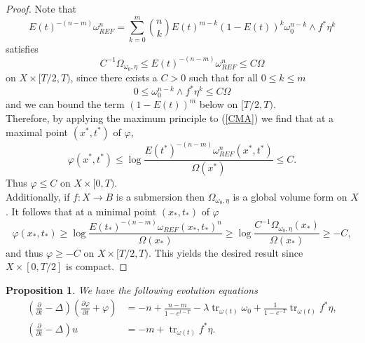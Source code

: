 \documentclass[12pt]{article}
\newtheorem{proposition}[theorem]{Proposition}
\numberwithin{equation}{section}
\renewcommand{\d}{\partial}
\DeclareMathOperator{\tr}{tr}
\newcommand{\parabolic}[1]{\left(\frac{\d}{\d t} - \Delta_{#1}\right)}
\begin{document}
\begin{proof}
Note that
\begin{equation*}
    E(t)^{-(n-m)}\omega_{REF}^n = \sum_{k=0}^m {n \choose k} E(t)^{m-k} (1-E(t))^{k} \omega_0^{n-k} \wedge f^* \eta^k
\end{equation*}
satisfies
\begin{equation*}
    C^{-1} \Omega_{\omega_0,\eta} \leq E(t)^{-(n-m)} \omega_{REF}^n \leq C\Omega
\end{equation*}
on $X \times [T/2, T)$, since there exists a $C > 0$ such that for all $0 \leq k \leq m$
\begin{equation*}
    0 \leq \omega_0^{n-k} \wedge f^* \eta ^k \leq C\Omega
\end{equation*}
and we can bound the term $(1-E(t))^m$ below on $[T/2,T)$.\\
Therefore, by applying the maximum principle to (\ref{CMA}) we find that at a maximal point $(x^*,t^*)$ of $\varphi$,
\begin{equation*}
    \varphi(x^*,t^*) \leq \log \frac{E(t^*)^{-(n-m)}\omega^n_{REF}(x^*,t^*)}{\Omega(x^*)} \leq C.
\end{equation*}
Thus $\varphi \leq C$ on $X \times [0,T)$.\\
Additionally, if $f: X \to B$ is a submersion then $\Omega_{\omega_0,\eta}$ is a global volume form on $X$. It follows that at a minimal point $(x_*,t_*)$ of $\varphi$
\begin{equation*}
     \varphi(x_*,t_*) \geq \log \frac{E(t_*)^{-(n-m)} \omega_{REF}(x_*,t_*)^{n}}{\Omega(x_*)} \geq \log \frac{C^{-1}\Omega_{\omega_0,\eta}(x_*)}{\Omega(x_*)} \geq -C,
\end{equation*}
and thus $\varphi \geq -C$ on $X \times [T/2,T)$. This yields the desired result since $X \times [0,T/2]$ is compact.
\end{proof}


\begin{proposition}
We have the following evolution equations
\begin{align*}
    \parabolic{} \left(\frac{\d \varphi}{\d t} + \varphi\right) &= -n + \frac{n-m}{1-e^{t-T}} - \lambda \tr_{\omega(t)} \omega_0 + \frac{1}{1-e^{-T}} \tr_{\omega(t)} f^* \eta,\\
    \parabolic{} u &= -m + \tr_{\omega(t)} f^* \eta.
\end{align*}
\end{proposition}
\end{document}
